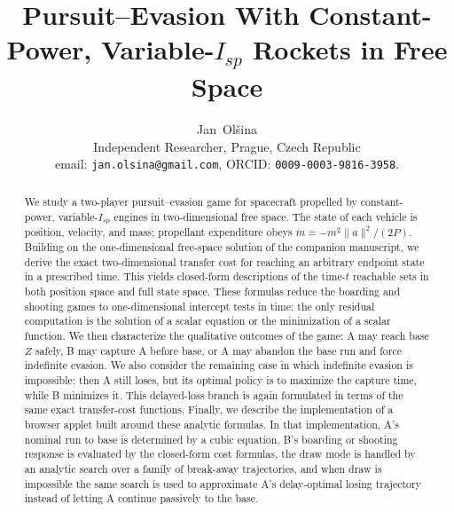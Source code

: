\documentclass[journal, a4paper]{IEEEtran}
\begin{document}
\title{Pursuit--Evasion With Constant-Power, Variable-$I_{\!sp}$ Rockets in Free Space}

\author{Jan~Ol\v{s}ina\\[1ex] Independent Researcher, Prague, Czech Republic\\
email: \texttt{jan.olsina@gmail.com}, ORCID: \texttt{0009-0003-9816-3958}.}

\maketitle

\begin{abstract}
We study a two-player pursuit--evasion game for spacecraft propelled by constant-power, variable-$I_{\!sp}$ engines in two-dimensional free space. The state of each vehicle is position, velocity, and mass; propellant expenditure obeys $\dot m = -m^2\|a\|^2/(2P)$. Building on the one-dimensional free-space solution of the companion manuscript, we derive the exact two-dimensional transfer cost for reaching an arbitrary endpoint state in a prescribed time. This yields closed-form descriptions of the time-$t$ reachable sets in both position space and full state space. These formulas reduce the boarding and shooting games to one-dimensional intercept tests in time: the only residual computation is the solution of a scalar equation or the minimization of a scalar function. We then characterize the qualitative outcomes of the game: A may reach base $Z$ safely, B may capture A before base, or A may abandon the base run and force indefinite evasion. We also consider the remaining case in which indefinite evasion is impossible: then A still loses, but its optimal policy is to maximize the capture time, while B minimizes it. This delayed-loss branch is again formulated in terms of the same exact transfer-cost functions. Finally, we describe the implementation of a browser applet built around these analytic formulas. In that implementation, A's nominal run to base is determined by a cubic equation, B's boarding or shooting response is evaluated by the closed-form cost formulas, the draw mode is handled by an analytic search over a family of break-away trajectories, and when draw is impossible the same search is used to approximate A's delay-optimal losing trajectory instead of letting A continue passively to the base.
\end{abstract}
\end{document}
